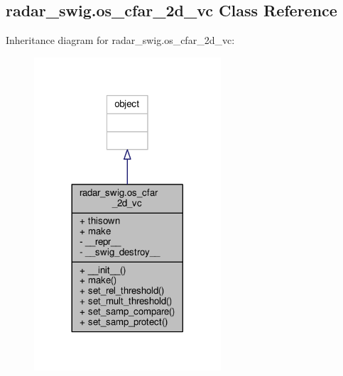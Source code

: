 \subsection{radar\+\_\+swig.\+os\+\_\+cfar\+\_\+2d\+\_\+vc Class Reference}
\label{classradar__swig_1_1os__cfar__2d__vc}


Inheritance diagram for radar\+\_\+swig.\+os\+\_\+cfar\+\_\+2d\+\_\+vc\+:
\nopagebreak
\begin{figure}[H]
\begin{center}
\leavevmode
\includegraphics[width=197pt]{d7/d21/classradar__swig_1_1os__cfar__2d__vc__inherit__graph}
\end{center}
\end{figure}


